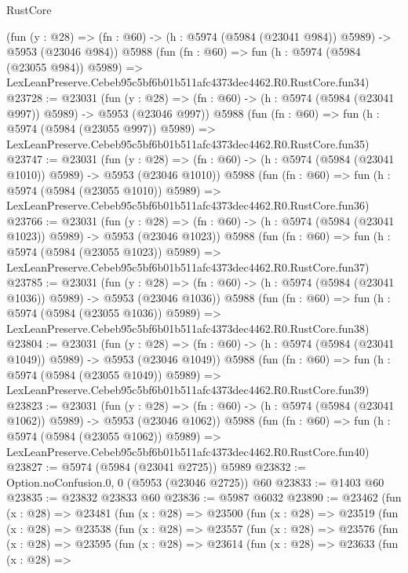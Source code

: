\begin{lexlean}{RustCore}
\begin{coremodule}
    (fun (y : @28) => (fn : @60) -> (h : @5974 (@5984 (@23041 @984)) @5989) -> @5953 (@23046 @984))
    @5988
    (fun (fn : @60) =>
    fun (h : @5974 (@5984 (@23055 @984)) @5989) =>
    LexLeanPreserve.Cebeb95c5bf6b01b511afc4373dec4462.R0.RustCore.fun34)
@23728 := @23031
    (fun (y : @28) => (fn : @60) -> (h : @5974 (@5984 (@23041 @997)) @5989) -> @5953 (@23046 @997))
    @5988
    (fun (fn : @60) =>
    fun (h : @5974 (@5984 (@23055 @997)) @5989) =>
    LexLeanPreserve.Cebeb95c5bf6b01b511afc4373dec4462.R0.RustCore.fun35)
@23747 := @23031
    (fun (y : @28) =>
    (fn : @60) -> (h : @5974 (@5984 (@23041 @1010)) @5989) -> @5953 (@23046 @1010))
    @5988
    (fun (fn : @60) =>
    fun (h : @5974 (@5984 (@23055 @1010)) @5989) =>
    LexLeanPreserve.Cebeb95c5bf6b01b511afc4373dec4462.R0.RustCore.fun36)
@23766 := @23031
    (fun (y : @28) =>
    (fn : @60) -> (h : @5974 (@5984 (@23041 @1023)) @5989) -> @5953 (@23046 @1023))
    @5988
    (fun (fn : @60) =>
    fun (h : @5974 (@5984 (@23055 @1023)) @5989) =>
    LexLeanPreserve.Cebeb95c5bf6b01b511afc4373dec4462.R0.RustCore.fun37)
@23785 := @23031
    (fun (y : @28) =>
    (fn : @60) -> (h : @5974 (@5984 (@23041 @1036)) @5989) -> @5953 (@23046 @1036))
    @5988
    (fun (fn : @60) =>
    fun (h : @5974 (@5984 (@23055 @1036)) @5989) =>
    LexLeanPreserve.Cebeb95c5bf6b01b511afc4373dec4462.R0.RustCore.fun38)
@23804 := @23031
    (fun (y : @28) =>
    (fn : @60) -> (h : @5974 (@5984 (@23041 @1049)) @5989) -> @5953 (@23046 @1049))
    @5988
    (fun (fn : @60) =>
    fun (h : @5974 (@5984 (@23055 @1049)) @5989) =>
    LexLeanPreserve.Cebeb95c5bf6b01b511afc4373dec4462.R0.RustCore.fun39)
@23823 := @23031
    (fun (y : @28) =>
    (fn : @60) -> (h : @5974 (@5984 (@23041 @1062)) @5989) -> @5953 (@23046 @1062))
    @5988
    (fun (fn : @60) =>
    fun (h : @5974 (@5984 (@23055 @1062)) @5989) =>
    LexLeanPreserve.Cebeb95c5bf6b01b511afc4373dec4462.R0.RustCore.fun40)
@23827 := @5974 (@5984 (@23041 @2725)) @5989
@23832 := Option.noConfusion.{0, 0} (@5953 (@23046 @2725)) @60
@23833 := @1403 @60
@23835 := @23832 @23833 @60
@23836 := @5987 @6032
@23890 := @23462
    (fun (x : @28) =>
    @23481
      (fun (x : @28) =>
      @23500
        (fun (x : @28) =>
        @23519
          (fun (x : @28) =>
          @23538
            (fun (x : @28) =>
            @23557
              (fun (x : @28) =>
              @23576
                (fun (x : @28) =>
                @23595
                  (fun (x : @28) =>
                  @23614
                    (fun (x : @28) =>
                    @23633
                      (fun (x : @28) =>

\end{coremodule}
\end{lexlean}

